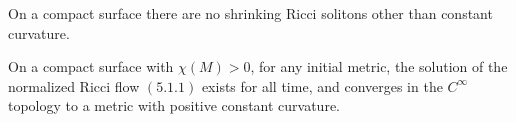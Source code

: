 \begin{proposition} 
  \label{prop:cz-compact-shrinking-surface-soliton-rigidity}

On a compact surface there are no shrinking Ricci solitons other
than constant curvature.
\end{proposition}
\begin{theorem}
  \label{thm:cz-positive-euler-surface-convergence}

On a compact surface with $\chi(M)>0$, for any initial metric, the
solution of the normalized Ricci flow $(5.1.1)$ exists for all
time, and converges in the $C^\infty$ topology to a metric with
positive constant curvature.
\end{theorem}
